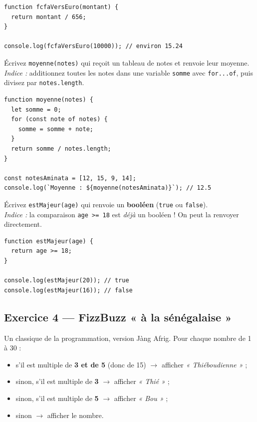 \documentclass[11pt,a4paper]{article}
\newcommand{\code}[1]{\texttt{#1}}
\begin{document}
\begin{lstlisting}[style=js]
function fcfaVersEuro(montant) {
  return montant / 656;
}

console.log(fcfaVersEuro(10000)); // environ 15.24
\end{lstlisting}

\begin{objectifbox}
Écrivez \code{moyenne(notes)} qui reçoit un tableau de notes et renvoie leur moyenne.\\
\emph{Indice :} additionnez toutes les notes dans une variable \code{somme} avec \code{for...of}, puis divisez par \code{notes.length}.
\end{objectifbox}

\begin{lstlisting}[style=js]
function moyenne(notes) {
  let somme = 0;
  for (const note of notes) {
    somme = somme + note;
  }
  return somme / notes.length;
}

const notesAminata = [12, 15, 9, 14];
console.log(`Moyenne : ${moyenne(notesAminata)}`); // 12.5
\end{lstlisting}

\begin{objectifbox}
Écrivez \code{estMajeur(age)} qui renvoie un \textbf{booléen} (\code{true} ou \code{false}).\\
\emph{Indice :} la comparaison \code{age >= 18} est \emph{déjà} un booléen ! On peut la renvoyer directement.
\end{objectifbox}

\begin{lstlisting}[style=js]
function estMajeur(age) {
  return age >= 18;
}

console.log(estMajeur(20)); // true
console.log(estMajeur(16)); // false
\end{lstlisting}

\subsection*{Exercice 4 --- FizzBuzz « à la sénégalaise »}

Un classique de la programmation, version Jàng Afrig. Pour chaque nombre de 1 à 30 :
\begin{itemize}[leftmargin=*,noitemsep]
  \item s'il est multiple de \textbf{3 et de 5} (donc de 15) $\rightarrow$ afficher \emph{« Thiéboudienne »} ;
  \item sinon, s'il est multiple de \textbf{3} $\rightarrow$ afficher \emph{« Thié »} ;
  \item sinon, s'il est multiple de \textbf{5} $\rightarrow$ afficher \emph{« Bou »} ;
  \item sinon $\rightarrow$ afficher le nombre.
\end{itemize}
\end{document}
